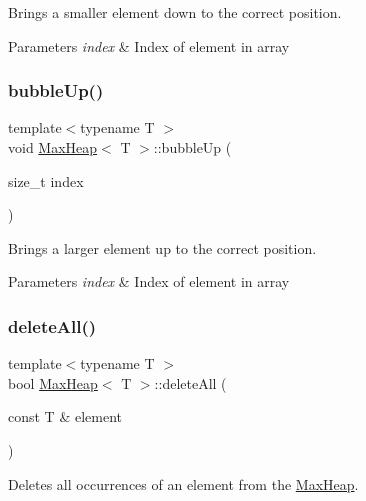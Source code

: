 Brings a smaller element down to the correct position. 


\begin{DoxyParams}{Parameters}
{\em index} & Index of element in array \\
\hline
\end{DoxyParams}
\mbox{\label{class_max_heap_a9799c77a0dccb11d45e22e2756659af1}} 
\subsubsection{\texorpdfstring{bubble\+Up()}{bubbleUp()}}
{\footnotesize\ttfamily template$<$typename T $>$ \\
void \hyperlink{class_max_heap}{Max\+Heap}$<$ T $>$\+::bubble\+Up (\begin{DoxyParamCaption}\item[{size\+\_\+t}]{index }\end{DoxyParamCaption})\hspace{0.3cm}{\ttfamily [private]}}



Brings a larger element up to the correct position. 


\begin{DoxyParams}{Parameters}
{\em index} & Index of element in array \\
\hline
\end{DoxyParams}
\mbox{\label{class_max_heap_afb84751d5d8f891260a4e30bdc2d2c38}} 
\subsubsection{\texorpdfstring{delete\+All()}{deleteAll()}}
{\footnotesize\ttfamily template$<$typename T $>$ \\
bool \hyperlink{class_max_heap}{Max\+Heap}$<$ T $>$\+::delete\+All (\begin{DoxyParamCaption}\item[{const T \&}]{element }\end{DoxyParamCaption})}



Deletes all occurrences of an element from the \hyperlink{class_max_heap}{Max\+Heap}. 


